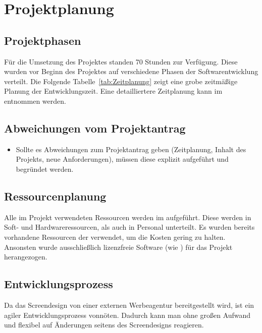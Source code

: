 \section{Projektplanung} 
\label{sec:Projektplanung}


\subsection{Projektphasen}
\label{sec:Projektphasen}

Für die Umsetzung des Projektes standen 70 Stunden zur Verfügung. Diese wurden vor
Beginn des Projektes auf verschiedene Phasen der Softwarentwicklung verteilt.
Die Folgende Tabelle~\ref{tab:Zeitplanung} zeigt eine grobe zeitmäßige Planung
der Entwicklungszeit.
Eine detailliertere Zeitplanung kann im  entnommen werden.




\subsection{Abweichungen vom Projektantrag}
\label{sec:AbweichungenProjektantrag}

\begin{itemize}
	\item Sollte es Abweichungen zum Projektantrag geben (\zB Zeitplanung, Inhalt des Projekts, neue Anforderungen),
	 müssen diese explizit aufgeführt und begründet werden.
\end{itemize}


\subsection{Ressourcenplanung}
\label{sec:Ressourcenplanung}
Alle im Projekt verwendeten Ressourcen werden im 
aufgeführt. Diese werden in Soft- und Hardwareressourcen, als auch in Personal
unterteilt. Es wurden bereits vorhandene Ressourcen der \mh verwendet, um die
Kosten gering zu halten. Ansonsten wurde ausschließlich lizenzfreie Software (wie \zB
{}) für das Projekt herangezogen.



\subsection{Entwicklungsprozess}
\label{sec:Entwicklungsprozess}
Da das Screendesign von einer externen Werbeagentur bereitgestellt wird, ist
ein agiler Entwicklungsprozess vonnöten. Dadurch kann man ohne großen Aufwand
und flexibel auf Änderungen seitens des Screendesigns reagieren.


